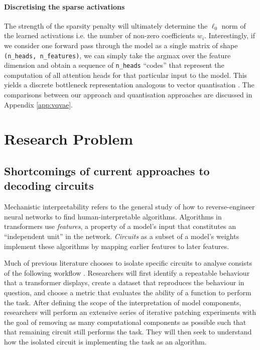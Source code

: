 \documentclass[11pt]{scrartcl}
\begin{document}
\paragraph{Discretising the sparse activations}
The strength of the sparsity penalty will ultimately determine the $\ell_0$ norm of the learned activations i.e. the number of non-zero coefficients $w_i$. Interestingly, if we consider one forward pass through the model as a single matrix of shape \texttt{(n\_heads, n\_features)}, we can simply take the argmax over the feature dimension and obtain a sequence of \texttt{n\_heads} ``codes'' that represent the computation of all attention heads for that particular input to the model. This yields a discrete bottleneck representation analogous to vector quantisation \cite{van2017neural}. The comparisons between our approach and quantisation approaches are discussed in Appendix \ref{app:vqvae}.



\section{Research Problem}

\subsection{Shortcomings of current approaches to decoding circuits}
Mechanistic interpretability refers to the general study of how to reverse-engineer neural networks to find human-interpretable algorithms. Algorithms in transformers use \textit{features}, a property of a model's input that constitutes an ``independent unit'' in the network. \textit{Circuits} as a subset of a model's weights implement these algorithms by mapping earlier features to later features. 

Much of previous literature chooses to isolate specific circuits to analyse consists of the following workflow \cite{conmy2024towards}. Researchers will first identify a repeatable behaviour that a transformer displays, create a dataset that reproduces the behaviour in question, and choose a metric that evaluates the ability of a function to perform the task. After defining the scope of the interpretation of model components, researchers will perform an extensive series of iterative patching experiments with the goal of removing as many computational components as possible such that that remaining circuit still performs the task. They will then seek to understand how the isolated circuit is implementing the task as an algorithm. 
\end{document}
